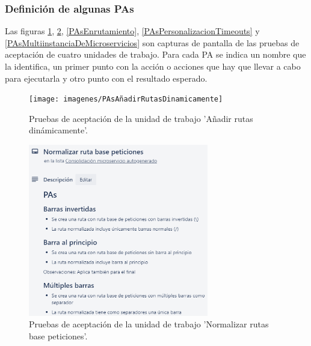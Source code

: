 \documentclass[11pt,spanish,listoffigures]{tfgetsinf}
\begin{document}

			\subsubsection{Definición de algunas PAs}

Las figuras \ref{PAsAñadirRutasDinamicamente}, \ref{PAsNormalizarRutaBasePeticiones}, \ref{PAsEnrutamiento}, \ref{PAsPersonalizacionTimeouts} y \ref{PAsMultiinstanciaDeMicroservicios} son capturas de pantalla de las pruebas de aceptación de cuatro unidades de trabajo. Para cada PA se indica un nombre que la identifica, un primer punto con la acción o acciones que hay que llevar a cabo para ejecutarla y otro punto con el resultado esperado.

\begin{figure}[ht]
\centering
\texttt{[image: imagenes/PAsAñadirRutasDinamicamente]}
\caption{Pruebas de aceptación de la unidad de trabajo 'Añadir rutas dinámicamente'.}
	\label{PAsAñadirRutasDinamicamente}
\end{figure}

\begin{figure}[ht]
\centering
\includegraphics[width=0.7\textwidth]{imagenes/PAsNormalizarRutaBasePeticiones}
\caption{Pruebas de aceptación de la unidad de trabajo 'Normalizar rutas base peticiones'.}
	\label{PAsNormalizarRutaBasePeticiones}
\end{figure}
\end{document}
